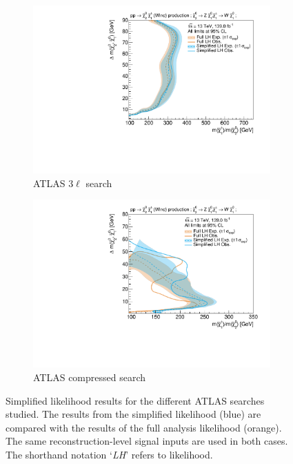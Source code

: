 \begin{figure}
\begin{subfigure}[b]{0.5\textwidth}
		\centering\includegraphics[width=\textwidth]{exclusion_3Loffshell_noLabel_v3}
		\caption{ATLAS $3\ell$ search\label{fig:results_3Loffshell}}
	\end{subfigure}\hfill
	\begin{subfigure}[b]{0.5\textwidth}
		\centering\includegraphics[width=\textwidth]{exclusion_compressed_noLabel_v3}
		\caption{ATLAS compressed search~\cite{SUSY-2018-16}\label{fig:results_compressed}}
	\end{subfigure}\hfill
	\caption{Simplified likelihood results for the different ATLAS searches studied. The results from the simplified likelihood (blue) are compared with the results of the full analysis likelihood (orange). The same reconstruction-level signal inputs are used in both cases. The shorthand notation `\textit{LH}' refers to likelihood.}\label{fig:results_analyses}
\end{figure}

